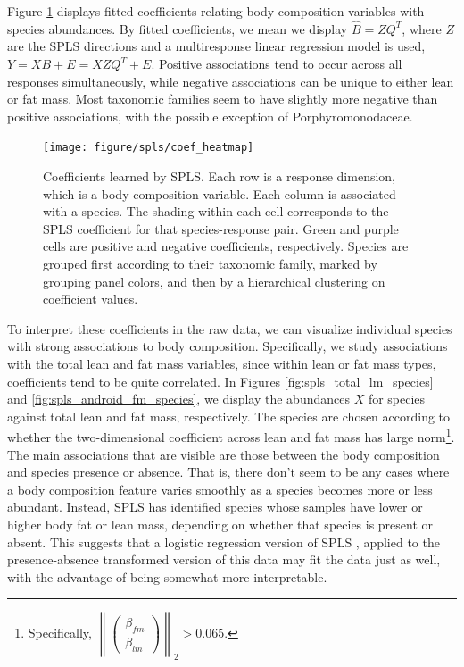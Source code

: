 \documentclass[14pt]{extarticle}
\begin{document}
Figure \ref{fig:spls_coef_heatmap} displays fitted coefficients relating body
composition variables with species abundances. By fitted coefficients, we mean
we display $\hat{B} = ZQ^T$, where $Z$ are the SPLS directions and a
multiresponse linear regression model is used, $Y = XB + E = XZQ^T + E$.
Positive associations tend to occur across all responses
simultaneously, while negative associations can be unique to either lean or fat
mass. Most taxonomic families seem to have slightly more negative than positive
associations, with the possible exception of Porphyromonodaceae.

\begin{figure}
  \centering
  \texttt{[image: figure/spls/coef\_heatmap]}
  \caption{
    Coefficients learned by SPLS. Each row is a response dimension, which is a
    body composition variable. Each column is associated with a species. The
    shading within each cell corresponds to the SPLS coefficient for that
    species-response pair. Green and purple cells are positive and negative
    coefficients, respectively. Species are grouped first according to their
    taxonomic family, marked by grouping panel colors, and then by a
    hierarchical clustering on coefficient values.
    \label{fig:spls_coef_heatmap} }
\end{figure}

To interpret these coefficients in the raw data, we can visualize individual
species with strong associations to body composition. Specifically, we study
associations with the total lean and fat mass variables, since within lean or
fat mass types, coefficients tend to be quite correlated. In Figures
\ref{fig:spls_total_lm_species} and \ref{fig:spls_android_fm_species}, we display
the abundances $X$ for species against total lean and fat mass, respectively.
The species are chosen according to whether the two-dimensional coefficient
across lean and fat mass has large norm\footnote{Specifically,
  $\left\| \begin{pmatrix} \beta_{fm} \\ \beta_{lm} \end{pmatrix} \right\|_{2} >
  0.065$.}. The main associations that are visible are those between the body
composition and species presence or absence. That is, there don't seem to be any
cases where a body composition feature varies smoothly as a species becomes more
or less abundant. Instead, SPLS has identified species whose samples have lower or
higher body fat or lean mass, depending on whether that species is present or
absent. This suggests that a logistic regression version of SPLS
\citep{chung2010sparse}, applied to the presence-absence transformed version of
this data may fit the data just as well, with the advantage of being somewhat
more interpretable.
\end{document}
